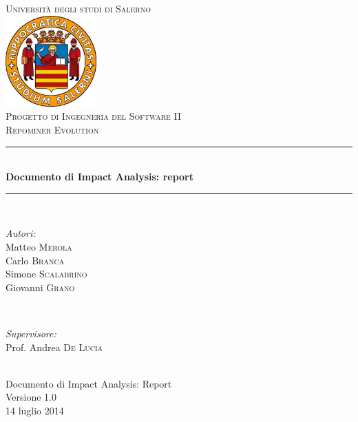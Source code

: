 \documentclass[a4paper, 12pt, italian]{report}
\begin{document}
\begin{titlepage}
\newcommand{\HRule}{\rule{\linewidth}{0.5mm}} 
\center 
\textsc{\LARGE Università degli studi di Salerno}\\[1cm] 
\includegraphics[width=3.5cm]{img/logo.jpg} \\[1cm]
\textsc{\large Progetto di Ingegneria del Software II}\\[0.5cm]
\textsc{\Large Repominer Evolution}\\[0.5cm] 
 \HRule \\[0.4cm]
{ \large \bfseries Documento di Impact Analysis: report}\\[0.4cm] 
\HRule \\[1.5cm]

\begin{minipage}{0.4\textwidth}
\begin{flushleft} \large
\emph{Autori:}\\
Matteo \textsc{Merola}\\
Carlo \textsc{Branca}\\
Simone \textsc{Scalabrino}\\
Giovanni \textsc{Grano}\\
\end{flushleft}
\end{minipage}
~
\begin{minipage}{0.4\textwidth}
\begin{flushright} \large
\emph{Supervisore:} \\
Prof. Andrea \textsc{De Lucia}
\end{flushright}
\end{minipage}\\[2.5cm]

{\Large Documento di Impact Analysis: Report}\\
Versione 1.0\\[1cm]

{\large 14 luglio 2014} %

\vfill

\end{titlepage}	
    
	\setcounter{tocdepth}{1}	
	\tableofcontents
	\listoffigures
	
	
	
	
	
	
	
%
\end{document}
